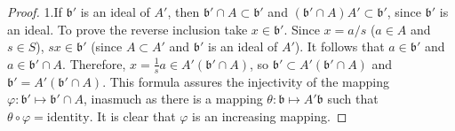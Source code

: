 \begin{proof}
1.\quad If $\mathfrak{b}'$ is an ideal of $A'$, then
$\mathfrak{b}'\cap A\subset\mathfrak{b}'$ and
$(\mathfrak{b}'\cap A)A'\subset\mathfrak{b}'$, since $\mathfrak{b}'$ is an
ideal. To prove the reverse inclusion take $x\in\mathfrak{b}'$. Since
$x=a/s$ ($a\in A$ and $s\in S$), $sx\in\mathfrak{b}'$ (since $A\subset A'$
and $\mathfrak{b}'$ is an ideal of $A'$). It follows that
$a\in\mathfrak{b}'$ and $a\in\mathfrak{b}'\cap A$. Therefore,
$x=\frac{1}{s}a\in A'(\mathfrak{b}'\cap A)$, so
$\mathfrak{b}'\subset A'(\mathfrak{b}'\cap A)$ and
$\mathfrak{b}'=A'(\mathfrak{b}'\cap A)$. This formula assures the injectivity
of the mapping $\varphi:\mathfrak{b}'\mapsto\mathfrak{b}'\cap A$, inasmuch as
there is a mapping $\theta:\mathfrak{b}\mapsto A'\mathfrak{b}$ such that
$\theta\circ\varphi=\text{identity}$. It is clear that $\varphi$ is an
increasing mapping.


\end{proof}
